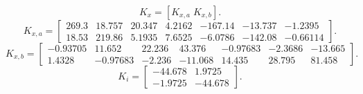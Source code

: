 \[K_x=[K_{x,a}\;K_{x,b}].\]
{\small\[K_{x,a}=\begin{bmatrix}269.3 & 18.757 & 20.347 & 4.2162 & -167.14 & -13.737 & -1.2395\\
18.53 & 219.86 & 5.1935 & 7.6525 & -6.0786 & -142.08 & -0.66114\end{bmatrix}.\]}
{\small\[K_{x,b}=\begin{bmatrix}-0.93705 & 11.652 & 22.236 & 43.376 & -0.97683 & -2.3686 & -13.665\\
1.4328 & -0.97683 & -2.236 & -11.068 & 14.435 & 28.795 & 81.458\end{bmatrix}.\]}
\[K_i=\begin{bmatrix}-44.678 & 1.9725\\
-1.9725 & -44.678\end{bmatrix}.\]
